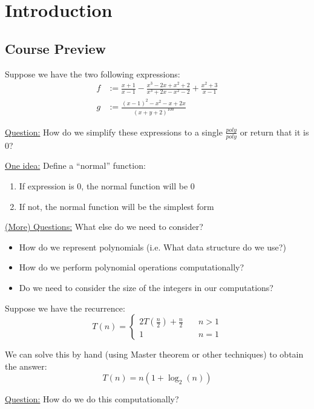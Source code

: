 \section{Introduction}

\subsection{Course Preview}
\begin{example}
    Suppose we have the two following expressions:
    \begin{align}
        f &:= \frac{x+1}{x-1} - \frac{x^3 - 2x + x^2 + 2}{x^3 +2x -x^2 -2} + \frac{x^2 +3}{x-1} \\
        g &:= \frac{(x-1)^2 - x^2 -x  +2x}{(x+y+2)^{100}}
    \end{align}

    \underline{Question:} How do we simplify these expressions to a single $\frac{poly}{poly}$ or return that it is $0$?

    \underline{One idea:} Define a ``normal'' function:
    \begin{enumerate}
        \item If expression is $0$, the normal function will be $0$
        \item If not, the normal function will be the simplest form
    \end{enumerate}

    \underline{(More) Questions:} What else do we need to consider?
    \begin{itemize}
        \item How do we represent polynomials (i.e. What data structure do we use?)
        \item How do we perform polynomial operations computationally?
        \item Do we need to consider the size of the integers in our computations?
    \end{itemize}
\end{example}

\begin{example}
    Suppose we have the recurrence:
    \begin{equation}
        T(n) = \begin{cases}
            2 T(\frac{n}{2}) + \frac{n}{2} \quad & n > 1 \\
            1 \quad & n = 1
        \end{cases}
    \end{equation}

    We can solve this by hand (using Master theorem or other techniques) to obtain the answer:
    \begin{equation}
        T(n) = n(1 + \log_2(n))
    \end{equation}

    \underline{Question:} How do we do this computationally?
\end{example}

